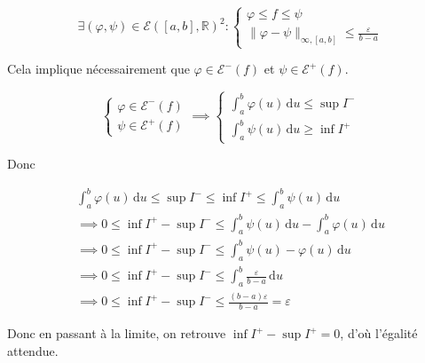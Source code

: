 \documentclass{article}
\renewenvironment{question_kholle}[2][ ]
{
	\subsection{\texorpdfstring{#2}{}}
	\notblank{#1}
	{
		\noindent #1
		\bigbreak
	}
	{}
	\begin{proof}
}
{
	\end{proof}
}
\begin{document}
\begin{question_kholle}
\begin{itemize}[label=$\lozenge$]
		      $$
			      \exists (\varphi, \psi) \in \mathcal{E}([a, b], \mathbb{R})^{2} : \left\{ \begin{array}{ll}
				      \varphi \leqslant f \leqslant \psi \\
				      \|\varphi - \psi\| _{\infty, [a, b]} \leqslant \frac{\varepsilon}{b-a}
			      \end{array}\right.
		      $$

		      Cela implique nécessairement que $\varphi \in \mathcal{E}^{-}(f)$ et $\psi \in \mathcal{E}^{+}(f)$.

		      $$
			      \left\{ \begin{array}{ll}
				      \varphi \in \mathcal{E}^{-}(f) \\
				      \psi \in \mathcal{E}^{+}(f)
			      \end{array}\right. \implies \left\{ \begin{array}{ll}
				      \int_{a}^{b} \varphi (u) \, \mathrm du \leqslant \sup I^{-} \\
				      \int_{a}^{b} \psi(u) \, \mathrm du \geqslant \inf I^{+}
			      \end{array}\right.
		      $$

		      Donc

		      \begin{align*}
			      \int_{a}^{b} \varphi(u) \, \mathrm du  \leqslant \sup I^{-} \leqslant \inf I^{+} \leqslant \int_{a}^{b} \psi(u) \, \mathrm du     \\
			      \implies 0 \leqslant \inf I^{+} - \sup I^{-} \leqslant \int_{a}^{b} \psi(u) \, \mathrm du - \int_{a}^{b} \varphi(u) \, \mathrm du \\
			      \implies 0 \leqslant \inf I^{+} - \sup I^{-} \leqslant \int_{a}^{b} \psi(u) - \varphi(u) \, \mathrm du                            \\
			      \implies 0 \leqslant \inf I^{+} - \sup I^{-} \leqslant \int_{a}^{b} \frac{\varepsilon}{b-a} \, \mathrm du                         \\
			      \implies 0 \leqslant \inf I^{+} - \sup I^{-} \leqslant \frac{(b-a)\varepsilon}{b-a} = \varepsilon
		      \end{align*}


		      Donc en passant à la limite, on retrouve $\inf I^{+} - \sup I^{+} = 0$, d'où l'égalité attendue.
	\end{itemize}
\end{question_kholle}
\end{document}
